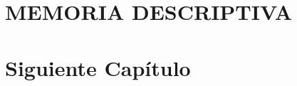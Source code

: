 \documentclass[12pt,a4paper,oneside]{report}
\begin{document}
	\begin{titlepage}
		
	\end{titlepage}
	
	
	
	\chapter*{}
	
	
	\chapter*{}
	
	
	\renewcommand{\contentsname}{ÍNDICE}
	\tableofcontents
	
	\chapter{MEMORIA DESCRIPTIVA}
	
	
	\chapter{Siguiente Capítulo}
	
	

	 
	
\end{document}
